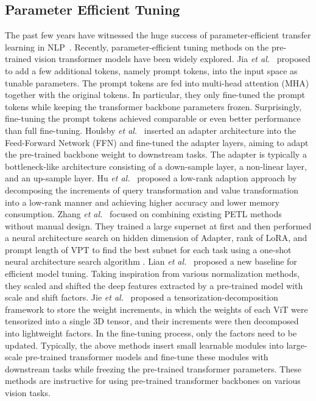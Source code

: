 \documentclass[10pt,journal,letterpaper,compsoc]{IEEEtran}
\begin{document}
\subsection{Parameter Efficient Tuning}
The past few years have witnessed the huge success of parameter-efficient transfer learning in NLP~\cite{PES_LLMFT, DBLP:conf/coling/ZhouMZCGZHXW22, DBLP:journals/corr/abs-2210-16771, LadderSideTune, UniPELT, DeltaTuning}. Recently, parameter-efficient tuning methods on the pre-trained vision transformer models have been widely explored. Jia \emph{et al.}~\cite{vpt} proposed to add a few additional tokens, namely prompt tokens, into the input space as tunable parameters. The prompt tokens are fed into multi-head attention (MHA) together with the original tokens.
In particular, they only fine-tuned the prompt tokens while keeping the transformer backbone parameters frozen. Surprisingly, fine-tuning the prompt tokens achieved comparable or even better performance than full fine-tuning. Houlsby \emph{et al.}~\cite{adapter} inserted an adapter architecture into the Feed-Forward Network (FFN) and fine-tuned the adapter layers, aiming to adapt the pre-trained backbone weight to downstream tasks. The adapter is typically a bottleneck-like architecture consisting of a down-sample layer, a non-linear layer, and an up-sample layer. Hu \emph{et al.}~\cite{Lora} proposed a low-rank adaption approach by decomposing the increments of query transformation and value transformation into a low-rank manner and achieving higher accuracy and lower memory consumption.
Zhang \emph{et al.}~\cite{NOAH} focused on combining existing PETL methods without manual design. They trained a large supernet at first and then performed a neural architecture search on hidden dimension  of Adapter, rank  of LoRA, and prompt length  of VPT to find the best subnet for each task using a one-shot neural architecture search algorithm \cite{2021AutoFormer}. Lian \emph{et al.}~\cite{SSF} proposed a new baseline for efficient model tuning. Taking inspiration from various normalization methods, they scaled and shifted the deep features extracted by a pre-trained model with scale and shift factors. Jie \emph{et al.}~\cite{FacT} proposed a tensorization-decomposition framework to store the weight increments, in which the weights of each ViT were tensorized into a single 3D tensor, and their increments were then decomposed into lightweight factors. In the fine-tuning process, only the factors need to be updated. Typically, the above methods insert small learnable modules into large-scale pre-trained transformer models and fine-tune these modules with downstream tasks while freezing the pre-trained transformer parameters. These methods are instructive for using pre-trained transformer backbones on various vision tasks. 
\end{document}
